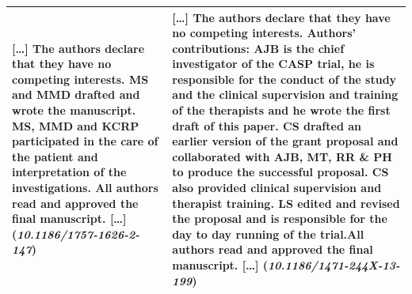 \documentclass[fleqn,10pt]{wlscirep}
\begin{document}
\begin{table}[ht]
\begin{tabular}{@{}p{}p{}@{}}
[\dots] {\bfseries The authors declare that they have no competing interests.} MS and MMD drafted and wrote the manuscript. MS, MMD and KCRP participated in the care of the patient and interpretation of the investigations. {\bfseries All authors read and approved the final manuscript.} [\dots] ({\itshape 10.1186/1757-1626-2-147})
& [\dots] {\bfseries The authors declare that they have no competing interests.} Authors' contributions: AJB is the chief investigator of the CASP trial, he is responsible for the conduct of the study and the clinical supervision and training of the therapists and he wrote the first draft of this paper. CS drafted an earlier version of the grant proposal and collaborated with AJB, MT, RR \& PH to produce the successful proposal. CS also provided clinical supervision and therapist training. LS edited and revised the proposal and is responsible for the day to day running of the trial.{\bfseries All authors read and approved the final manuscript.} [\dots] ({\itshape 10.1186/1471-244X-13-199}) \\
\bottomrule
\end{tabular}
\end{table}
\end{document}
